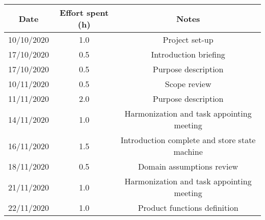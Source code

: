 \documentclass[../../main.tex]{subfiles}
\begin{document}
    \begin{center}
        \begin{tabular}{|c| |c| |c|} 
            \hline
            Date & Effort spent (h) & Notes\\ [0.5ex] 
            \hline\hline
            10/10/2020 & 1.0 & Project set-up\\ 
            17/10/2020 & 0.5 & Introduction briefing\\ 
            17/10/2020 & 0.5 & Purpose description\\ 
            10/11/2020 & 0.5 & Scope review\\
            11/11/2020 & 2.0 & Purpose description\\
            14/11/2020 & 1.0 & Harmonization and task appointing meeting\\
            16/11/2020 & 1.5 & Introduction complete and store state machine\\
            18/11/2020 & 0.5 & Domain assumptions review\\
            21/11/2020 & 1.0 & Harmonization and task appointing meeting\\
            22/11/2020 & 1.0 & Product functions definition\\
            \hline
        \end{tabular}
    \end{center}
\end{document}
